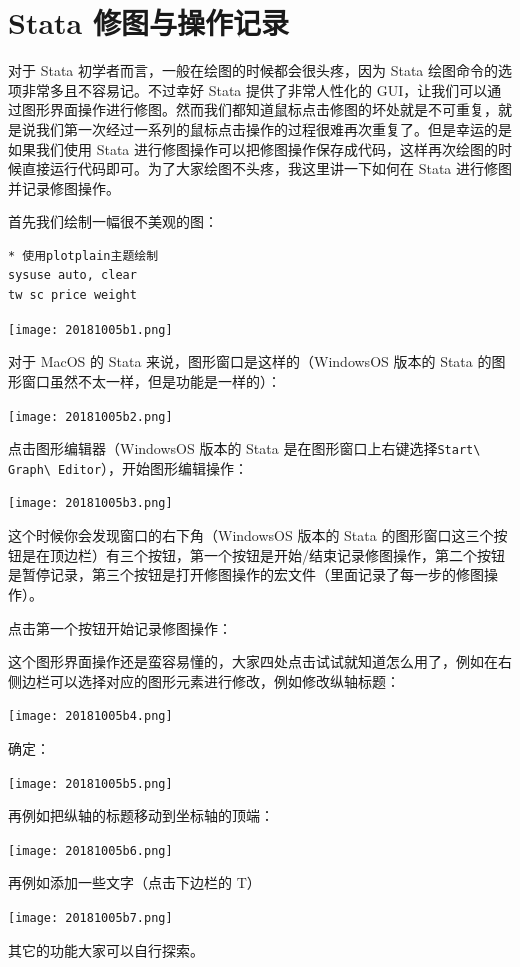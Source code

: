 \documentclass[cn,fancy,blue,11pt]{elegantbook}
\begin{document}
\hypertarget{stata--9}{%
\chapter{Stata 修图与操作记录}\label{stata--9}}

对于 Stata 初学者而言，一般在绘图的时候都会很头疼，因为 Stata 绘图命令的选项非常多且不容易记。不过幸好 Stata 提供了非常人性化的 GUI，让我们可以通过图形界面操作进行修图。然而我们都知道鼠标点击修图的坏处就是不可重复，就是说我们第一次经过一系列的鼠标点击操作的过程很难再次重复了。但是幸运的是如果我们使用 Stata 进行修图操作可以把修图操作保存成代码，这样再次绘图的时候直接运行代码即可。为了大家绘图不头疼，我这里讲一下如何在 Stata 进行修图并记录修图操作。

首先我们绘制一幅很不美观的图：

\begin{lstlisting}
* 使用plotplain主题绘制
sysuse auto, clear
tw sc price weight
\end{lstlisting}

\texttt{[image: 20181005b1.png]}

对于 MacOS 的 Stata 来说，图形窗口是这样的（WindowsOS 版本的 Stata 的图形窗口虽然不太一样，但是功能是一样的）：

\texttt{[image: 20181005b2.png]}

点击图形编辑器（WindowsOS 版本的 Stata 是在图形窗口上右键选择\lstinline{Start\ Graph\ Editor}），开始图形编辑操作：

\texttt{[image: 20181005b3.png]}

这个时候你会发现窗口的右下角（WindowsOS 版本的 Stata 的图形窗口这三个按钮是在顶边栏）有三个按钮，第一个按钮是开始/结束记录修图操作，第二个按钮是暂停记录，第三个按钮是打开修图操作的宏文件（里面记录了每一步的修图操作）。

点击第一个按钮开始记录修图操作：

这个图形界面操作还是蛮容易懂的，大家四处点击试试就知道怎么用了，例如在右侧边栏可以选择对应的图形元素进行修改，例如修改纵轴标题：

\texttt{[image: 20181005b4.png]}

确定：

\texttt{[image: 20181005b5.png]}

再例如把纵轴的标题移动到坐标轴的顶端：

\texttt{[image: 20181005b6.png]}

再例如添加一些文字（点击下边栏的 T）

\texttt{[image: 20181005b7.png]}

其它的功能大家可以自行探索。
\end{document}
